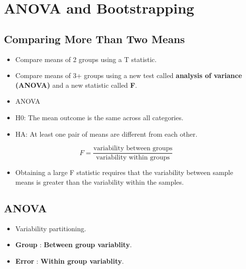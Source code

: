 \documentclass[]{book}
\providecommand{\tightlist}{%
  \setlength{\itemsep}{0pt}\setlength{\parskip}{0pt}}
\begin{document}
\hypertarget{anova-and-bootstrapping}{%
\section*{ANOVA and Bootstrapping}\label{anova-and-bootstrapping}}

\hypertarget{comparing-more-than-two-means}{%
\subsection*{Comparing More Than Two Means}\label{comparing-more-than-two-means}}

\begin{itemize}
\item
  Compare means of 2 groups using a T statistic.
\item
  Compare means of 3+ groups using a new test called \textbf{analysis of variance (ANOVA)} and a new statistic called \textbf{F}.
\item
  ANOVA
\item
  H0: The mean outcome is the same across all categories.
\item
  HA: At least one pair of means are different from each other.
\end{itemize}

\[ F = \frac{\text{variability between groups}}{\text{variability within groups}}\]

\begin{itemize}
\tightlist
\item
  Obtaining a large F statistic requires that the variability between sample means is greater than the variability within the samples.
\end{itemize}

\hypertarget{anova}{%
\subsection*{ANOVA}\label{anova}}

\begin{itemize}
\item
  Variability partitioning.
\item
  \textbf{Group} : \textbf{Between group variablity}.
\item
  \textbf{Error} : \textbf{Within group variablity}.
\end{itemize}
\end{document}

